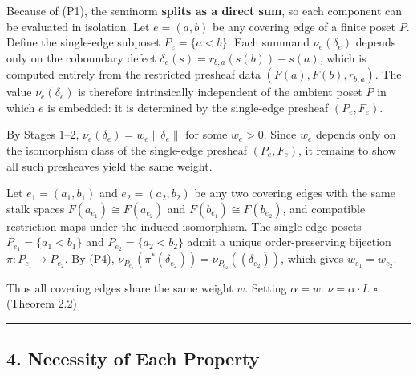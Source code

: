 \documentclass[
]{article}
\begin{document}
Because of (P1), the seminorm \textbf{splits as a direct sum}, so each
component can be evaluated in isolation. Let \(e = (a, b)\) be any
covering edge of a finite poset \(P\). Define the single-edge subposet
\(P_e = \{a < b\}\). Each summand \(\nu_e(\delta_e)\) depends only on
the coboundary defect \(\delta_e(s) = r_{b,a}(s(b)) - s(a)\), which is
computed entirely from the restricted presheaf data
\((F(a), F(b), r_{b,a})\). The value \(\nu_e(\delta_e)\) is therefore
intrinsically independent of the ambient poset \(P\) in which \(e\) is
embedded: it is determined by the single-edge presheaf \((P_e, F_e)\).

By Stages 1--2, \(\nu_e(\delta_e) = w_e \|\delta_e\|\) for some
\(w_e > 0\). Since \(w_e\) depends only on the isomorphism class of the
single-edge presheaf \((P_e, F_e)\), it remains to show all such
presheaves yield the same weight.

Let \(e_1 = (a_1, b_1)\) and \(e_2 = (a_2, b_2)\) be any two covering
edges with the same stalk spaces \(F(a_{e_1}) \cong F(a_{e_2})\) and
\(F(b_{e_1}) \cong F(b_{e_2})\), and compatible restriction maps under
the induced isomorphism. The single-edge posets
\(P_{e_1} = \{a_1 < b_1\}\) and \(P_{e_2} = \{a_2 < b_2\}\) admit a
unique order-preserving bijection \(\pi: P_{e_1} \to P_{e_2}\). By (P4),
\(\nu_{P_{e_1}}(\pi^*(\delta_{e_2})) = \nu_{P_{e_2}}((\delta_{e_2}))\),
which gives \(w_{e_1} = w_{e_2}\).

Thus all covering edges share the same weight \(w\). Setting
\(\alpha = w\): \(\nu = \alpha \cdot I\). \(\square\) (Theorem 2.2)

\begin{center}\rule{0.5\linewidth}{0.5pt}\end{center}

\subsection{4. Necessity of Each
Property}\label{necessity-of-each-property}
\end{document}
